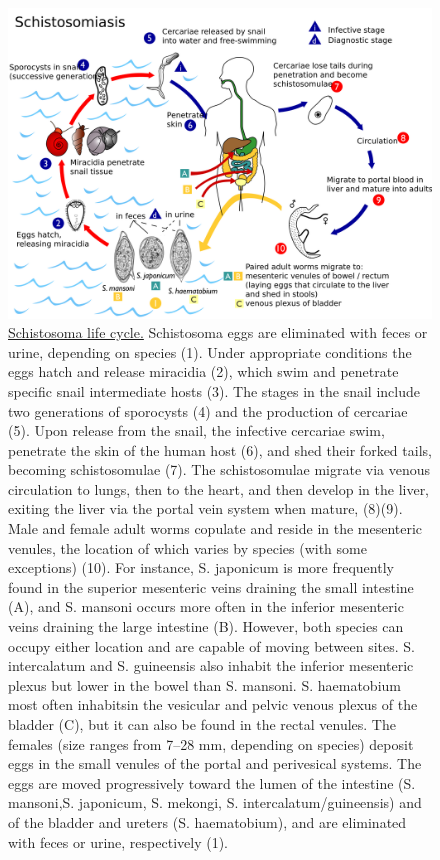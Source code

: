 \begin{figure}

{\centering \includegraphics[width=0.7\linewidth]{./figures/animals/Schistosoma_life_cycle} 

}

\caption{\href{https://commons.wikimedia.org/wiki/File:Schistosoma_life_cycle.svg}{Schistosoma life cycle.} Schistosoma eggs are eliminated with feces or urine, depending on species (1). Under appropriate conditions the eggs hatch and release miracidia (2), which swim and penetrate specific snail intermediate hosts (3). The stages in the snail include two generations of sporocysts (4) and the production of cercariae (5). Upon release from the snail, the infective cercariae swim, penetrate the skin of the human host (6), and shed their forked tails, becoming schistosomulae (7). The schistosomulae migrate via venous circulation to lungs, then to the heart, and then develop in the liver, exiting the liver via the portal vein system when mature, (8)(9). Male and female adult worms copulate and reside in the mesenteric venules, the location of which varies by species (with some exceptions) (10). For instance, S. japonicum is more frequently found in the superior mesenteric veins draining the small intestine (A), and S. mansoni occurs more often in the inferior mesenteric veins draining the large intestine (B). However, both species can occupy either location and are capable of moving between sites. S. intercalatum and S. guineensis also inhabit the inferior mesenteric plexus but lower in the bowel than S. mansoni. S. haematobium most often inhabitsin the vesicular and pelvic venous plexus of the bladder (C), but it can also be found in the rectal venules. The females (size ranges from 7--28 mm, depending on species) deposit eggs in the small venules of the portal and perivesical systems. The eggs are moved progressively toward the lumen of the intestine (S. mansoni,S. japonicum, S. mekongi, S. intercalatum/guineensis) and of the bladder and ureters (S. haematobium), and are eliminated with feces or urine, respectively (1).}\label{fig:schistosomalifecycle}
\end{figure}

